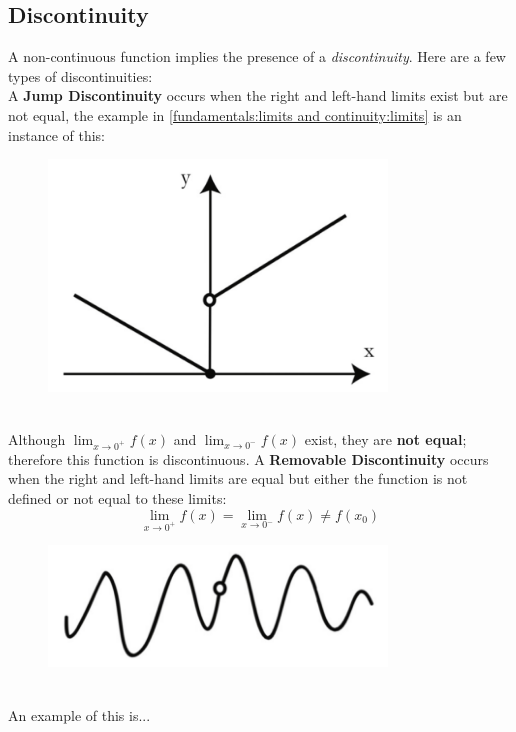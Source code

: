 \documentclass{report}
\begin{document}
\subsection{Discontinuity} %
A non-continuous function implies the presence of a \textit{discontinuity}. Here are a few
types of discontinuities:\\
A \textbf{Jump Discontinuity} occurs when the right and left-hand limits exist but are not equal,
the example in \ref{fundamentals:limits and continuity:limits} is an instance of this:
\begin{figure}[h]
\includegraphics[width=9cm]{Capture3}
\centering
\end{figure}\\
Although $\lim_{x\to 0^+}f(x)$ and $\lim_{x\to 0^-}f(x)$ exist, they are \textbf{not equal};
therefore this function is discontinuous.
\newpage
\noindent A \textbf{Removable Discontinuity} occurs when the right and left-hand limits are equal but either
the function is not defined or not equal to these limits:
\begin{equation*}
\lim_{x\to 0^+}f(x)=\lim_{x\to 0^-}f(x)\neq f(x_0)
\end{equation*}
\begin{figure}[h]
\includegraphics[width=9cm]{Capture4}
\centering
{}
\end{figure}\\
An example of this is...%
\\
\vspace{2mm}\\
\end{document}
